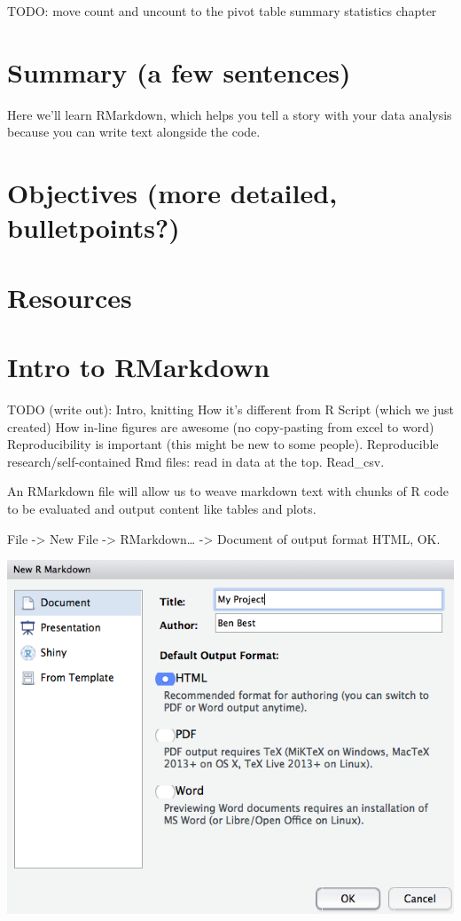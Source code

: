 \documentclass[]{book}
\begin{document}
TODO: move count and uncount to the pivot table summary statistics chapter

\hypertarget{summary-a-few-sentences-1}{%
\section{Summary (a few sentences)}\label{summary-a-few-sentences-1}}

Here we'll learn RMarkdown, which helps you tell a story with your data analysis because you can write text alongside the code.

\hypertarget{objectives-more-detailed-bulletpoints-1}{%
\section{Objectives (more detailed, bulletpoints?)}\label{objectives-more-detailed-bulletpoints-1}}

\hypertarget{resources-1}{%
\section{Resources}\label{resources-1}}

\hypertarget{intro-to-rmarkdown}{%
\section{Intro to RMarkdown}\label{intro-to-rmarkdown}}

TODO (write out):
Intro, knitting
How it's different from R Script (which we just created)
How in-line figures are awesome (no copy-pasting from excel to word)
Reproducibility is important (this might be new to some people). Reproducible research/self-contained Rmd files: read in data at the top. Read\_csv.

An RMarkdown file will allow us to weave markdown text with chunks of R code to be evaluated and output content like tables and plots.

File -\textgreater{} New File -\textgreater{} RMarkdown\ldots{} -\textgreater{} Document of output format HTML, OK.

\includegraphics[width=0.8\linewidth]{img/rstudio_new-rmd-doc-html}
\end{document}
